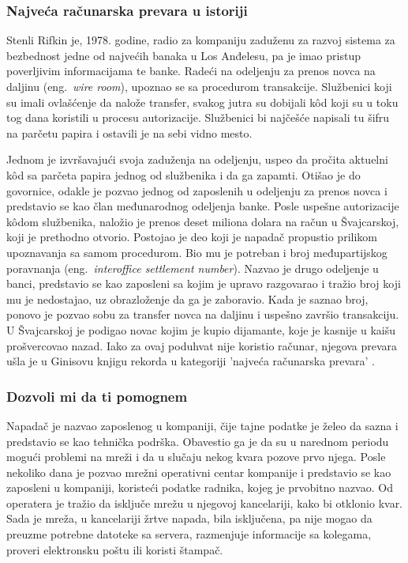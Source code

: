 \documentclass[a4paper]{article}
\begin{document}
\subsubsection{Najveća računarska prevara u istoriji}
\label{hack_za_ginisa}

Stenli Rifkin je, 1978. godine, radio za kompaniju zaduženu za razvoj sistema za bezbednost jedne od najvećih banaka u Los Anđelesu, pa je imao pristup poverljivim informacijama te banke. Radeći na odeljenju za prenos novca na daljinu (eng.~{\em wire room}), upoznao se sa procedurom transakcije. Službenici koji su imali ovlašćenje da nalože transfer, svakog jutra su dobijali kôd koji su u toku tog dana koristili u procesu autorizacije. Službenici bi najčešće napisali tu šifru na parčetu papira i ostavili je na sebi vidno mesto. 

Jednom je izvršavajući svoja zaduženja na odeljenju, uspeo da pročita aktuelni kôd sa parčeta papira jednog od službenika i da ga zapamti. Otišao je do govornice, odakle je pozvao jednog od zaposlenih u odeljenju za prenos novca i predstavio se kao član međunarodnog odeljenja banke. Posle uspešne autorizacije kôdom službenika, naložio je prenos deset miliona dolara na račun u Švajcarskoj, koji je prethodno otvorio. Postojao je deo koji je napadač propustio prilikom upoznavanja sa samom procedurom. Bio mu je potreban i broj međupartijskog poravnanja (eng.~{\em interoffice settlement number}). Nazvao je drugo odeljenje u banci, predstavio se kao zaposleni sa kojim je upravo razgovarao i tražio broj koji mu je nedostajao, uz obrazloženje da ga je zaboravio. Kada je saznao broj, ponovo je pozvao sobu za transfer novca na daljinu i uspešno završio transakciju. U Švajcarskoj je podigao novac kojim je kupio dijamante, koje je kasnije u kaišu prošvercovao nazad. Iako za ovaj poduhvat nije koristio računar, njegova prevara ušla je u Ginisovu knjigu rekorda u kategoriji 'najveća računarska prevara' \cite{deception}.

\subsubsection{Dozvoli mi da ti pomognem}
\label{pomoc_neprijatelja}

Napadač je nazvao zaposlenog u kompaniji, čije tajne podatke je želeo da sazna i predstavio se kao tehnička podrška. Obavestio ga je da su u narednom periodu mogući problemi na mreži i da u slučaju nekog kvara pozove prvo njega. Posle nekoliko dana je pozvao mrežni operativni centar kompanije i predstavio se kao zaposleni u kompaniji, koristeći podatke radnika, kojeg je prvobitno nazvao. Od operatera je tražio da isključe mrežu u njegovoj kancelariji, kako bi otklonio kvar. Sada je mreža, u kancelariji žrtve napada, bila isključena, pa nije mogao da preuzme potrebne datoteke sa servera, razmenjuje informacije sa kolegama, proveri elektronsku poštu ili koristi štampač.
\end{document}
